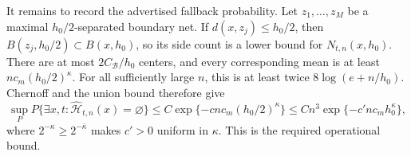 It remains to record the advertised fallback probability. Let \(z_1,\ldots,z_M\) be a maximal \(h_0/2\)-separated boundary net. If \(d(x,z_j)\le h_0/2\), then \(B(z_j,h_0/2)\subset B(x,h_0)\), so its side count is a lower bound for \(N_{t,n}(x,h_0)\). There are at most \(2C_{\mathcal B}/h_0\) centers, and every corresponding mean is at least \(nc_m(h_0/2)^\kappa\). For all sufficiently large \(n\), this is at least twice \(8\log(e+n/h_0)\). Chernoff and the union bound therefore give
\[
 \sup_P P\{\exists x,t:\widehat{\mathcal H}_{t,n}(x)=\varnothing\}
 \le C\exp\{-c n c_m(h_0/2)^\kappa\}
 \le Cn^3\exp\{-c' n c_mh_0^\kappa\},
\]
where \(2^{-\kappa}\ge2^{-\overline\kappa}\) makes \(c'>0\) uniform in \(\kappa\). This is the required operational bound.